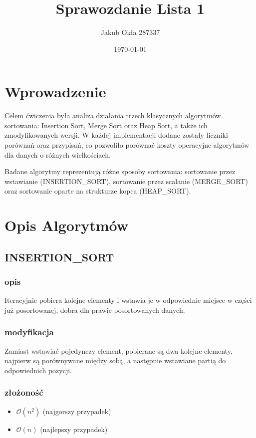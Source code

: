 \documentclass{article}
\title{Sprawozdanie Lista 1}
\author{Jakub Okła 287337}
\date{\today}
\begin{document}
\maketitle

\section{Wprowadzenie}
Celem ćwiczenia była analiza działania trzech klasycznych algorytmów sortowania: Insertion Sort, Merge Sort oraz Heap Sort, a także ich zmodyfikowanych wersji. W każdej implementacji dodane zostały liczniki porównań oraz przypisań, co pozwoliło porównać koszty operacyjne algorytmów dla danych o różnych wielkościach.

Badane algorytmy reprezentują różne sposoby sortowania: sortowanie przez wstawianie (INSERTION\_SORT), sortowanie przez scalanie (MERGE\_SORT) oraz sortowanie oparte na strukturze kopca (HEAP\_SORT).


\section{Opis Algorytmów}

\subsection{INSERTION\_SORT}
\subsubsection{opis}
Iteracyjnie pobiera kolejne elementy i wstawia je w odpowiednie miejsce w części już posortowanej, dobra dla prawie posortowanych danych.
\subsubsection{modyfikacja}
Zamiast wstawiać pojedynczy element, pobierane są dwa kolejne elementy,
najpierw są porównywane między sobą, a następnie wstawiane partią do odpowiednich pozycji.

\subsubsection{złożoność}
\begin{itemize}
    \item $\mathcal{O}(n^2)$ (najgorszy przypadek)
    \item $\mathcal{O}(n)$ (najlepszy przypadek)
\end{itemize}
\end{document}

